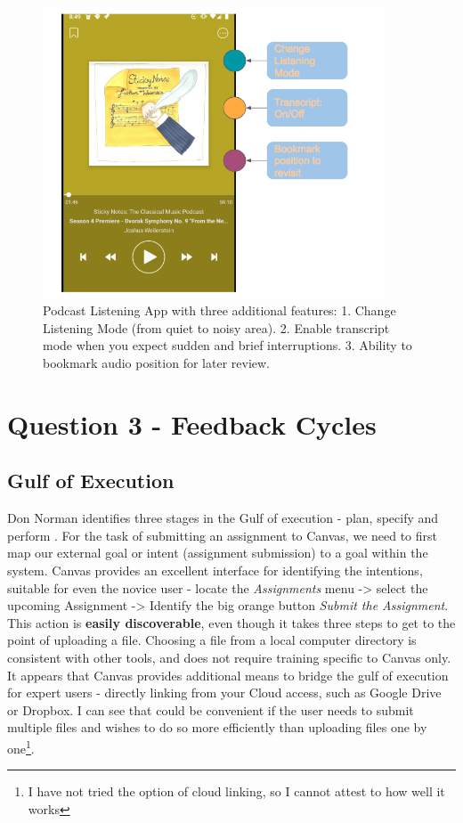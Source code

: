 \documentclass[12pt,letterpaper]{article}
\begin{document}
\begin{figure}[H]
\centering
\includegraphics[width=4in, scale=.4]{podcast.png}
\caption{Podcast Listening App with three additional features: 1. Change Listening Mode (from quiet to noisy area). 2. Enable transcript mode when you expect sudden and brief interruptions. 3. Ability to bookmark audio position for later review.}
\label{fig::3}
\end{figure}



\section*{Question 3 - Feedback Cycles}

\subsection*{Gulf of Execution}
Don Norman identifies three stages in the Gulf of execution - plan, specify and perform \cite{norman2013design}. For the task of submitting an assignment to Canvas, we need to first map our external goal or intent (assignment submission) to a goal within the system. Canvas provides an excellent interface for identifying the intentions, suitable for even the novice user - locate the \textit{Assignments} menu -> select the upcoming Assignment -> Identify the big orange button \textit{Submit the Assignment}. This action is \textbf{easily discoverable}, even though it takes three steps to get to the point of uploading a file. Choosing a file from a local computer directory is consistent with other tools, and does not require training specific to Canvas only. It appears that Canvas provides additional means to bridge the gulf of execution for expert users - directly linking from your Cloud access, such as Google Drive or Dropbox. I can see that could be convenient if the user needs to submit multiple files and wishes to do so more efficiently than uploading files one by one\footnote{I have not tried the option of cloud linking, so I cannot attest to how well it works}. 
\end{document}
